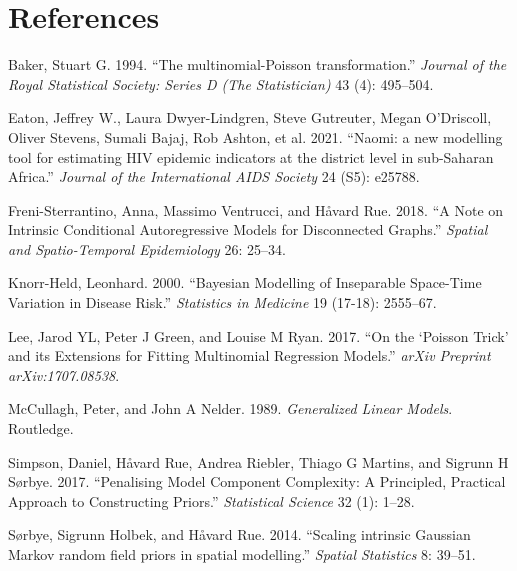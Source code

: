 \documentclass[
]{article}
\newlength{\cslhangindent}
\newlength{\cslentryspacingunit} %
\newenvironment{CSLReferences}[2] %
 {%
  \setlength{\parindent}{0pt}
  \ifodd #1
  \let\oldpar\par
  \def\par{\hangindent=\cslhangindent\oldpar}
  \fi
  \setlength{\parskip}{#2\cslentryspacingunit}
 }%
 {}
\begin{document}
\hypertarget{references}{%
\section*{References}\label{references}}

\hypertarget{refs}{}
\begin{CSLReferences}{1}{0}
\leavevmode{}%
Baker, Stuart G. 1994. {``{The multinomial-Poisson transformation}.''}
\emph{Journal of the Royal Statistical Society: Series D (The
Statistician)} 43 (4): 495--504.

\leavevmode{}%
Eaton, Jeffrey W., Laura Dwyer-Lindgren, Steve Gutreuter, Megan
O'Driscoll, Oliver Stevens, Sumali Bajaj, Rob Ashton, et al. 2021.
{``{Naomi: a new modelling tool for estimating HIV epidemic indicators
at the district level in sub-Saharan Africa}.''} \emph{Journal of the
International AIDS Society} 24 (S5): e25788.

\leavevmode{}%
Freni-Sterrantino, Anna, Massimo Ventrucci, and Håvard Rue. 2018. {``A
Note on Intrinsic Conditional Autoregressive Models for Disconnected
Graphs.''} \emph{Spatial and Spatio-Temporal Epidemiology} 26: 25--34.

\leavevmode{}%
Knorr-Held, Leonhard. 2000. {``Bayesian Modelling of Inseparable
Space-Time Variation in Disease Risk.''} \emph{Statistics in Medicine}
19 (17-18): 2555--67.

\leavevmode{}%
Lee, Jarod YL, Peter J Green, and Louise M Ryan. 2017. {``{On the
{`Poisson Trick'} and its Extensions for Fitting Multinomial Regression
Models}.''} \emph{arXiv Preprint arXiv:1707.08538}.

\leavevmode{}%
McCullagh, Peter, and John A Nelder. 1989. \emph{Generalized Linear
Models}. Routledge.

\leavevmode{}%
Simpson, Daniel, Håvard Rue, Andrea Riebler, Thiago G Martins, and
Sigrunn H Sørbye. 2017. {``Penalising Model Component Complexity: A
Principled, Practical Approach to Constructing Priors.''}
\emph{Statistical Science} 32 (1): 1--28.

\leavevmode{}%
Sørbye, Sigrunn Holbek, and Håvard Rue. 2014. {``{Scaling intrinsic
Gaussian Markov random field priors in spatial modelling}.''}
\emph{Spatial Statistics} 8: 39--51.


\end{CSLReferences}
\end{document}
